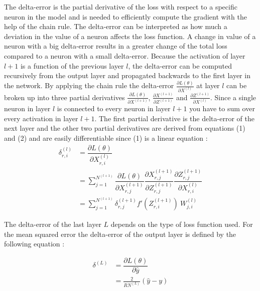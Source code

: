 \documentclass[a4paper, twoside]{article}
\newcommand*{\pd}[2]{\ensuremath{\dfrac{\partial #1}{\partial #2}}}
\newcommand*{\inpd}[2]{\ensuremath{\frac{\partial #1}{\partial #2}}}
\begin{document}
The delta-error is the partial derivative of the loss with respect to a specific neuron in the model and is needed to efficiently compute the gradient with the help of the chain rule. The delta-error can be interpreted as how much a deviation in the value of a neuron affects the loss function. A change in value of a neuron with a big delta-error results in a greater change of the total loss compared to a neuron with a small delta-error. Because the activation of layer $l+1$ is a function of the previous layer $l$, the delta-error can be computed recursively from the output layer and propagated backwards to the first layer in the network. By applying the chain rule the delta-error $\inpd{L(\theta)}{X^{(l)}}$  at layer $l$ can be broken up into three partial derivatives $\inpd{L(\theta)}{X^{(l+1)}}$, $\inpd{X^{(l+1)}}{Z^{(l+1)}}$ and $\inpd{Z^{(l+1)}}{X^{(l)}}$. Since a single neuron in layer $l$ is connected to every neuron in layer $l+1$ you have to sum over every activation in layer $l+1$. The first partial derivative is the delta-error of the next layer and the other two partial derivatives are derived from equations (1) and (2) and are easily differentiable since (1) is a linear equation \cite{cs231n} \cite{wikiStanford}:
\begin{equation}\label{dLdX_FCC}
\begin{split}
\delta^{(l)}_{r,i}
	& = \pd{L(\theta)}{X^{(l)}_{r,i}}  \\
	& = \sum^{N^{(l+1)}}_{j=1} \pd{L(\theta)}{X^{(l+1)}_{r,j}} \pd{X^{(l+1)}_{r,j}}{Z^{(l+1)}_{r,j}} \pd{Z^{(l+1)}_{r,j}}{X^{(l)}_{r,i}} \\
	& = \sum^{N^{(l+1)}}_{j=1} \delta^{(l+1)}_{r,j} f'(Z^{(l+1)}_{r,i}) \ W^{(l)}_{j,i} 
\end{split}
\end{equation}

The delta-error of the last layer $L$ depends on the type of loss function used. For the mean squared error the delta-error of the output layer is defined by the following equation \cite{cs231n} \cite{wikiStanford}:

\begin{equation}\label{MSEdelta}
\begin{split}
\delta^{(L)}
	& = \pd{L(\theta)}{\hat{y}}  \\
	& = \frac{2}{RN^{(L)}} (\hat{y}-y)
\end{split}
\end{equation}
\end{document}
